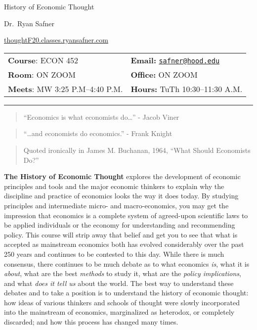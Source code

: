 \documentclass{article}
\begin{document}
\sffamily

\centerline{\Huge History of Economic Thought}

\vspace{3 mm}

\centerline{\large Dr.~Ryan Safner}
\vspace{2 mm}
\centerline{\large \href{http://thoughtF20.classes.ryansafner.com}{thoughtF20.classes.ryansafner.com}}

\vspace{5 mm}

\begin{tabular}{@{}p{3.5in}p{3.5in}}           
\textbf{Course}: ECON 452  & \textbf{Email:}  \href{mailto:safner@hood.edu}{\nolinkurl{safner@hood.edu}}\\
\textbf{Room}: ON ZOOM & \textbf{Office:}  ON ZOOM\\
\textbf{Meets}: MW 3:25 P.M--4:40 P.M. & \textbf{Hours:} TuTh 10:30--11:30 A.M.\\ 
\end{tabular}

\vspace{5 mm}

\hrule


\begin{quote}
``Economics is what economists do\ldots{}'' - Jacob Viner
\end{quote}

\begin{quote}
``\ldots and economists do economics.'' - Frank Knight
\end{quote}

\begin{quote}
Quoted ironically in James M. Buchanan, 1964, ``What Should Economists
Do?''
\end{quote}

\textbf{The History of Economic Thought} explores the development of
economic principles and tools and the major economic thinkers to explain
why the discipline and practice of economics looks the way it does
today. By studying principles and intermediate micro- and
macro-economics, you may get the impression that economics is a complete
system of agreed-upon scientific laws to be applied individuals or the
economy for understanding and recommending policy. This course will
strip away that belief and get you to see that what is accepted as
mainstream economics both has evolved considerably over the past 250
years and continues to be contested to this day. While there is much
consensus, there continues to be much debate as to what economics
\emph{is}, what it is \emph{about}, what are the best \emph{methods} to
study it, what are the \emph{policy implications}, and what \emph{does
it tell us} about the world. The best way to understand these debates
and to take a position is to understand the history of economic thought:
how ideas of various thinkers and schools of thought were slowly
incorporated into the mainstream of economics, marginalized as
heterodox, or completely discarded; and how this process has changed
many times.
\end{document}
